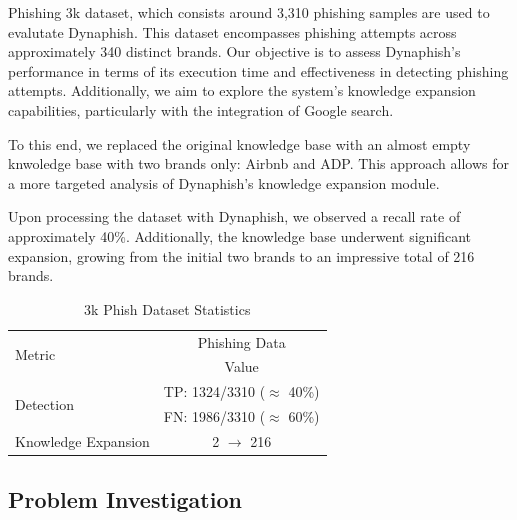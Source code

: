 

Phishing 3k dataset, which consists around 3,310 phishing samples are used to evalutate Dynaphish. This dataset encompasses phishing attempts across approximately 340 distinct brands. Our objective is to assess Dynaphish's performance in terms of its execution time and effectiveness in detecting phishing attempts. Additionally, we aim to explore the system's knowledge expansion capabilities, particularly with the integration of Google search.

To this end, we replaced the original knowledge base with an almost empty knwoledge base with two brands only: Airbnb and ADP. This approach allows for a more targeted analysis of Dynaphish's knowledge expansion module.

Upon processing the dataset with Dynaphish, we observed a recall rate of approximately 40\%. Additionally, the knowledge base underwent significant expansion, growing from the initial two brands to an impressive total of 216 brands.


\begin{table}[htbp]
\centering
\begin{tabular}{|l|c|}
\hline
\multirow{2}{*}{Metric} & Phishing Data \\ \cline{2-2} 
                        & Value \\ \hline
\multirow{2}{*}{Detection} & TP: 1324/3310 ($\approx$ 40\%) \\ \cline{2-2}
                           & FN: 1986/3310 ($\approx$ 60\%) \\ \hline
Knowledge Expansion       & 2 $\rightarrow$ 216 \\ \hline
\end{tabular}
\caption{3k Phish Dataset Statistics}
\end{table}



\subsection{Problem Investigation}

